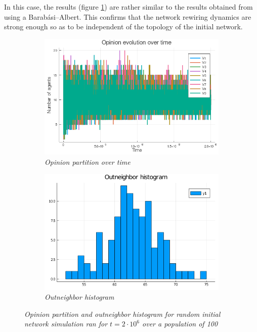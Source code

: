 \documentclass[12pt,openright,twoside]{book}
\begin{document}
In this case, the results (figure \ref{2_1_er:partition}) are rather similar to the results obtained from using a Barabási–Albert. This confirms that the network rewiring dynamics are strong enough so as to be independent of the topology of the initial network.\\

\begin{figure}[!htb]
\centering
\begin{subfigure}{0.49\linewidth}
    \includegraphics[width=\linewidth]{figures/2_2_er/vote_evolution.png}
    \caption{\textit{{\small Opinion partition over time}}}
    \label{2_1_er:partition}
\end{subfigure}
\begin{subfigure}{0.49\linewidth}
    \includegraphics[width=\linewidth]{figures/2_2_er/OutneighborHistogram.png}
    \caption{\textit{{\small Outneighbor histogram}}}
    \label{2_1_er:histogram}
\end{subfigure}
\caption{\textit{{\small Opinion partition and outneighbor histogram for random initial network simulation ran for $t=2\cdot 10^6$ over a population of 100}}}
\end{figure}
\end{document}
